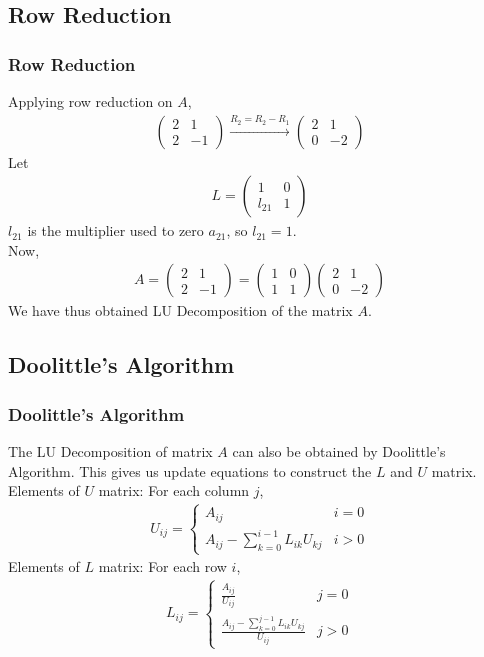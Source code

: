 \documentclass{beamer}
\theoremstyle{remark}
\newcommand{\myvec}[1]{\ensuremath{\begin{pmatrix}#1\end{pmatrix}}}
\numberwithin{equation}{section}
\begin{document}
    \subsection{Row Reduction}
    \begin{frame}
      \frametitle{Row Reduction}
      Applying row reduction on $A$,
      \begin{align}
        \myvec{2 & 1\\ 2 & -1} \xrightarrow{R_2 = R_2 - R_1} \myvec{2 & 1 \\ 0 & -2}
      \end{align}
      Let 
      \begin{align}
        L = \myvec{1 & 0\\ l_{21} & 1}
      \end{align}
      $l_{21}$ is the multiplier used to zero $a_{21}$, so $l_{21} = 1$.\\
      Now,
      \begin{align}
        A = \myvec{2 & 1 \\ 2 & -1} = \myvec{1 & 0 \\ 1 & 1}\myvec{2 & 1 \\ 0 & -2}
      \end{align}
      We have thus obtained LU Decomposition of the matrix $A$.    
    \end{frame}
    \subsection{Doolittle's Algorithm}
    \begin{frame}
      \frametitle{Doolittle's Algorithm}
The LU Decomposition of matrix $A$ can also be obtained by Doolittle's Algorithm. This gives us update equations to construct the $L$ and $U$ matrix. \newline
Elements of $U$ matrix:\newline
For each column $j$,
\begin{align}
  U_{ij} = \begin{cases}
    A_{ij} & i=0 \\
    A_{ij} - \sum _{k=0}^{i-1} L_{ik}U_{kj} & i>0
  \end{cases}
\end{align}
Elements of $L$ matrix:\newline
For each row $i$,
\begin{align}
  L_{ij} = \begin{cases}
    \frac{A_{ij}}{U_{ij}} & j=0 \\
    \frac{A_{ij} - \sum _{k=0}^{j-1} L_{ik}U_{kj}}{U_{ij}} & j>0
  \end{cases}
\end{align}    
    \end{frame}
\end{document}
